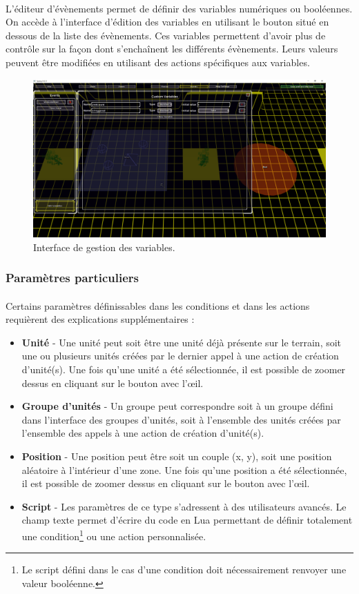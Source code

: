 \documentclass[a4paper]{article}
\begin{document}
\paragraph{ }
L'éditeur d'évènements permet de définir des variables numériques ou booléennes. On accède à l'interface d'édition des variables en utilisant le bouton situé en dessous de la liste des évènements. Ces variables permettent d'avoir plus de contrôle sur la façon dont s'enchaînent les différents évènements. Leurs valeurs peuvent être modifiées en utilisant des actions spécifiques aux variables.
\begin{figure}[H]
\centering
\includegraphics[width=\linewidth]{editor-variables.png}
\caption{Interface de gestion des variables.}
\label{fig:editor-variables}
\end{figure}
\subsubsection{Paramètres particuliers}
\paragraph{ }
Certains paramètres définissables dans les conditions et dans les actions requièrent des explications supplémentaires :
\begin{itemize}
\item \textbf{Unité} - Une unité peut soit être une unité déjà présente sur le terrain, soit une ou plusieurs unités créées par le dernier appel à une action de création d'unité(s). Une fois qu'une unité a été sélectionnée, il est possible de zoomer dessus en cliquant sur le bouton avec l'œil.
\item \textbf{Groupe d'unités} - Un groupe peut correspondre soit à un groupe défini dans l'interface des groupes d'unités, soit à l'ensemble des unités créées par l'ensemble des appels à une action de création d'unité(s).
\item \textbf{Position} - Une position peut être soit un couple (x, y), soit une position aléatoire à l'intérieur d'une zone. Une fois qu'une position a été sélectionnée, il est possible de zoomer dessus en cliquant sur le bouton avec l'œil.
\item \textbf{Script} - Les paramètres de ce type s'adressent à des utilisateurs avancés. Le champ texte permet d'écrire du code en Lua permettant de définir totalement une condition\footnote{Le script défini dans le cas d'une condition doit nécessairement renvoyer une valeur booléenne.} ou une action personnalisée.
\end{itemize}
\end{document}
